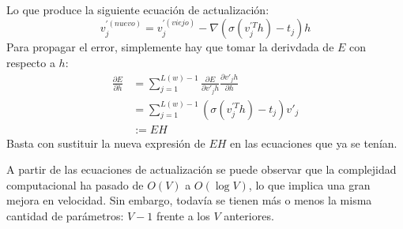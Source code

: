 Lo que produce la siguiente ecuación de actualización:
\begin{equation}
  v^{'(nuevo)}_j = v^{'(viejo)}_j - \nabla \left( \sigma\left( v^{'T}_j h \right) - t_j \right)h
\end{equation}
Para propagar el error, simplemente hay que tomar la derivdada de $E$ con respecto a $h$:
\begin{align}
  \frac{\partial E }{\partial h} & = \sum_{j=1}^{L(w) - 1}\frac{\partial E}{\partial v'_jh} \frac{\partial v'_jh}{\partial h} \\
                                 & = \sum_{j=1}^{L(w) - 1} \left( \sigma\left( v^{'T}_j h \right) - t_j \right)v'_j \\
                                 & := EH
\end{align}
Basta con sustituir la nueva expresión de $EH$ en las ecuaciones que ya se tenían.

A partir de las ecuaciones de actualización se puede observar que la complejidad computacional ha pasado de $O(V)$ a $O(\log V)$, lo que implica una gran mejora
en velocidad. Sin embargo, todavía se tienen más o menos la misma cantidad de parámetros: $V-1$ frente a los $V$ anteriores.